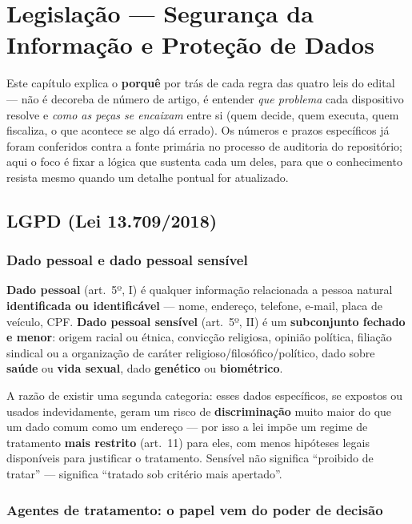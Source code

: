 \chapter{Legislação --- Segurança da Informação e Proteção de Dados}
\label{cap:legislacao-teoria}

Este capítulo explica o \textbf{porquê} por trás de cada regra das quatro
leis do edital --- não é decoreba de número de artigo, é entender \emph{que
problema} cada dispositivo resolve e \emph{como as peças se encaixam} entre
si (quem decide, quem executa, quem fiscaliza, o que acontece se algo dá
errado). Os números e prazos específicos já foram conferidos contra a fonte
primária no processo de auditoria do repositório; aqui o foco é fixar a
lógica que sustenta cada um deles, para que o conhecimento resista mesmo
quando um detalhe pontual for atualizado.

\section{LGPD (Lei 13.709/2018)}

\subsection{Dado pessoal e dado pessoal sensível}

\begin{conceito}
\textbf{Dado pessoal} (art.\ 5º, I) é qualquer informação relacionada a
pessoa natural \textbf{identificada ou identificável} --- nome, endereço,
telefone, e-mail, placa de veículo, CPF. \textbf{Dado pessoal sensível}
(art.\ 5º, II) é um \textbf{subconjunto fechado e menor}: origem racial ou
étnica, convicção religiosa, opinião política, filiação sindical ou a
organização de caráter religioso/filosófico/político, dado sobre
\textbf{saúde} ou \textbf{vida sexual}, dado \textbf{genético} ou
\textbf{biométrico}.

A razão de existir uma segunda categoria: esses dados específicos, se
expostos ou usados indevidamente, geram um risco de \textbf{discriminação}
muito maior do que um dado comum como um endereço --- por isso a lei impõe
um regime de tratamento \textbf{mais restrito} (art.\ 11) para eles, com
menos hipóteses legais disponíveis para justificar o tratamento. Sensível
não significa “proibido de tratar” --- significa “tratado sob critério mais
apertado”.
\end{conceito}

\subsection{Agentes de tratamento: o papel vem do poder de decisão}

